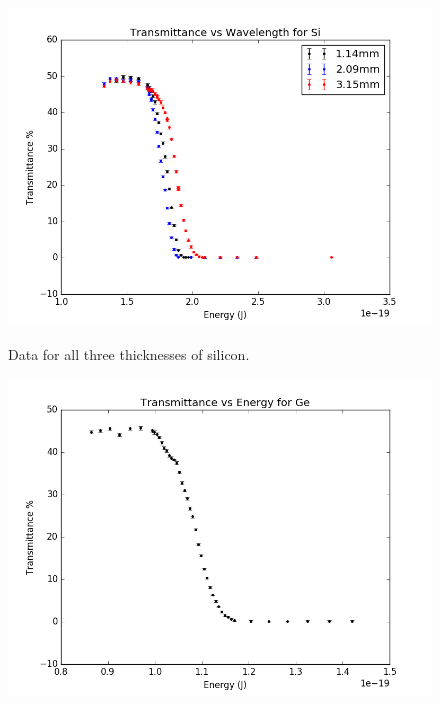 \documentclass{article}
\begin{document}
\begin{figure}[!htb]
	\centering
	\includegraphics[scale=.75]{plots/Si.png}
 	\label{Si}
	\caption{Data for all three thicknesses of silicon.}
\end{figure}

\begin{figure}[!htb]
	\centering
	\includegraphics[scale=.75]{plots/Ge.png}
 	\label{Ge}
\end{figure}
\end{document}
